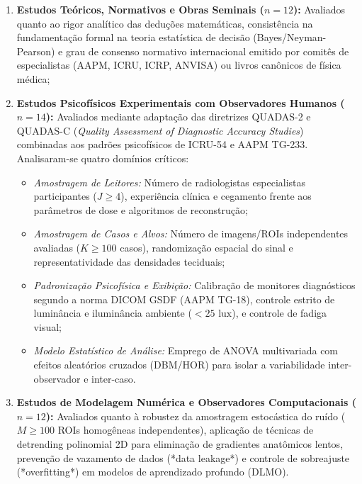\documentclass[
  12pt,
  a4paper,
  oneside
]{report}
\begin{document}
\begin{enumerate}
  \item \textbf{Estudos Teóricos, Normativos e Obras Seminais ($n = 12$):} Avaliados quanto ao rigor analítico das deduções matemáticas, consistência na fundamentação formal na teoria estatística de decisão (Bayes/Neyman-Pearson) e grau de consenso normativo internacional emitido por comitês de especialistas (AAPM, ICRU, ICRP, ANVISA) ou livros canônicos de física médica;
  \item \textbf{Estudos Psicofísicos Experimentais com Observadores Humanos ($n = 14$):} Avaliados mediante adaptação das diretrizes QUADAS-2 e QUADAS-C (\emph{Quality Assessment of Diagnostic Accuracy Studies}) combinadas aos padrões psicofísicos de ICRU-54 e AAPM TG-233. Analisaram-se quatro domínios críticos:
  \begin{itemize}
    \item \emph{Amostragem de Leitores:} Número de radiologistas especialistas participantes ($J \ge 4$), experiência clínica e cegamento frente aos parâmetros de dose e algoritmos de reconstrução;
    \item \emph{Amostragem de Casos e Alvos:} Número de imagens/ROIs independentes avaliadas ($K \ge 100$ casos), randomização espacial do sinal e representatividade das densidades teciduais;
    \item \emph{Padronização Psicofísica e Exibição:} Calibração de monitores diagnósticos segundo a norma DICOM GSDF (AAPM TG-18), controle estrito de luminância e iluminância ambiente ($< 25\text{ lux}$), e controle de fadiga visual;
    \item \emph{Modelo Estatístico de Análise:} Emprego de ANOVA multivariada com efeitos aleatórios cruzados (DBM/HOR) para isolar a variabilidade inter-observador e inter-caso.
  \end{itemize}
  \item \textbf{Estudos de Modelagem Numérica e Observadores Computacionais ($n = 12$):} Avaliados quanto à robustez da amostragem estocástica do ruído ($M \ge 100$ ROIs homogêneas independentes), aplicação de técnicas de detrending polinomial 2D para eliminação de gradientes anatômicos lentos, prevenção de vazamento de dados (*data leakage*) e controle de sobreajuste (*overfitting*) em modelos de aprendizado profundo (DLMO).
\end{enumerate}
\end{document}
